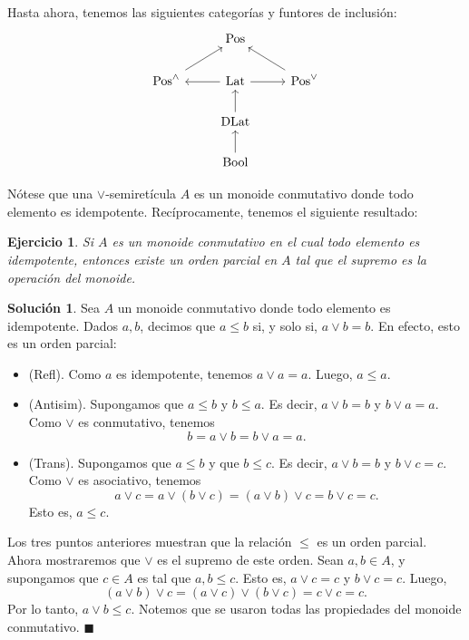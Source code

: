 \documentclass[12pt,letterpaper,titlepage]{article}
\newcommand{\xqed}[1]{%
  \leavevmode\unskip\penalty9999 \hbox{}\nobreak\hfill
  \quad\hbox{\ensuremath{#1}}}
\newtheorem{exe}{Ejercicio}
\theoremstyle{definition}
\newtheorem*{soltemp}{Solución}
\newenvironment{sol}[1]{%
    \begin{soltemp}#1}{%
    \xqed{\blacksquare}\end{soltemp}%
}
\renewcommand\sup{\vee}
\newcommand\<{\langle}
\renewcommand\>{\rangle}
\newcommand{\Pos}{\mathrm{Pos}}
\newcommand{\Lat}{\mathrm{Lat}}
\newcommand{\DLat}{\mathrm{DLat}}
\newcommand{\Bool}{\mathrm{Bool}}
\begin{document}
Hasta ahora, tenemos las siguientes categorías y funtores
de inclusión:
\[
    \begin{tikzcd}
        & \Pos \\
        \Pos^\wedge \arrow[ru]
            & \Lat \arrow[r] \arrow[l]
            & \Pos^\vee \arrow[lu] \\
        & \DLat \arrow[u] \\
        & \Bool \arrow[u]
    \end{tikzcd}
\]

Nótese que una $\sup$-semiretícula $A$ es un monoide
conmutativo donde todo elemento es idempotente.
Recíprocamente, tenemos el siguiente resultado:

\begin{exe}%
  Si $A$ es un monoide conmutativo en el cual todo elemento es
  idempotente, entonces existe un orden parcial en $A$ tal que el
  supremo es la operación del monoide.
\end{exe}
\begin{sol}
    Sea $A$ un monoide conmutativo donde todo elemento es idempotente.
    Dados $a,b$, decimos que $a\leq b$ si, y solo si, $a\sup b=b$.
    En efecto, esto es un orden parcial:
    \begin{itemize}
        \item (Refl). Como $a$ es idempotente, tenemos $a\sup a=a$.
        Luego, $a\leq a$.
        \item (Antisim). Supongamos que $a\leq b$ y $b\leq a$.
        Es decir, $a\sup b=b$ y $b\sup a=a$.
        Como $\sup$ es conmutativo, tenemos
        \[
            b = a\sup b = b\sup a = a
        .\]
        \item (Trans). Supongamos que $a\leq b$ y que $b\leq c$.
        Es decir, $a\sup b = b$ y $b\sup c = c$.
        Como $\sup$ es asociativo, tenemos
        \[
            a\sup c = a\sup(b\sup c) = (a\sup b)\sup c = b\sup c = c
        .\]
        Esto es, $a\leq c$.
    \end{itemize}
    Los tres puntos anteriores muestran que la relación $\leq$ es
    un orden parcial.
    Ahora mostraremos que $\sup$ es el supremo de este orden.
    Sean $a,b\in A$, y supongamos que $c\in A$ es tal que $a,b\leq c$.
    Esto es, $a\sup c = c$ y $b\sup c = c$.
    Luego,
    \[
        (a\sup b)\sup c = (a\sup c)\sup(b\sup c) = c\sup c = c
    .\]
    Por lo tanto, $a\sup b\leq c$.
    Notemos que se usaron todas las propiedades del monoide conmutativo.
\end{sol}
\end{document}
